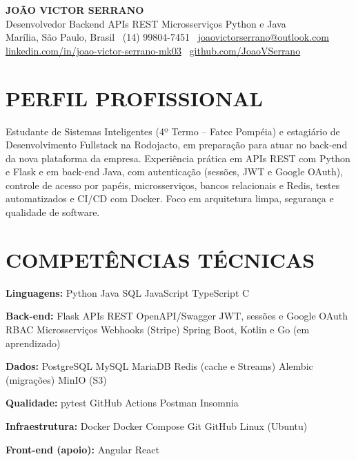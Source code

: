 \documentclass[9pt,a4paper]{extarticle}
\newcommand{\skill}[2]{\noindent\textbf{#1} #2\par}
\begin{document}
\begin{center}
  {\bfseries\color{navy}\fontsize{19}{22}\selectfont JOÃO VICTOR SERRANO}\\[2pt]
  {\color{gray}\fontsize{10}{12}\selectfont Desenvolvedor Backend \textperiodcentered{} APIs REST \textperiodcentered{} Microsserviços \textperiodcentered{} Python e Java}\\[3pt]
  {\color{gray}\fontsize{8.6}{10.5}\selectfont Marília, São Paulo, Brasil \textbar\ (14) 99804-7451 \textbar\ \href{mailto:joaovictorserrano@outlook.com}{joaovictorserrano@outlook.com}\\
  \href{https://www.linkedin.com/in/joao-victor-serrano-mk03}{linkedin.com/in/joao-victor-serrano-mk03} \textbar\ \href{https://github.com/JoaoVSerrano}{github.com/JoaoVSerrano}}
\end{center}
\section*{PERFIL PROFISSIONAL}
Estudante de Sistemas Inteligentes (4º Termo – Fatec Pompéia) e estagiário de Desenvolvimento Fullstack na Rodojacto, em preparação para atuar no back-end da nova plataforma da empresa. Experiência prática em APIs REST com Python e Flask e em back-end Java, com autenticação (sessões, JWT e Google OAuth), controle de acesso por papéis, microsserviços, bancos relacionais e Redis, testes automatizados e CI/CD com Docker. Foco em arquitetura limpa, segurança e qualidade de software.

\section*{COMPETÊNCIAS TÉCNICAS}
\skill{Linguagens:}{Python \textperiodcentered{} Java \textperiodcentered{} SQL \textperiodcentered{} JavaScript \textperiodcentered{} TypeScript \textperiodcentered{} C}
\skill{Back-end:}{Flask \textperiodcentered{} APIs REST \textperiodcentered{} OpenAPI/Swagger \textperiodcentered{} JWT, sessões e Google OAuth \textperiodcentered{} RBAC \textperiodcentered{} Microsserviços \textperiodcentered{} Webhooks (Stripe) \textperiodcentered{} Spring Boot, Kotlin e Go (em aprendizado)}
\skill{Dados:}{PostgreSQL \textperiodcentered{} MySQL \textperiodcentered{} MariaDB \textperiodcentered{} Redis (cache e Streams) \textperiodcentered{} Alembic (migrações) \textperiodcentered{} MinIO (S3)}
\skill{Qualidade:}{pytest \textperiodcentered{} GitHub Actions \textperiodcentered{} Postman \textperiodcentered{} Insomnia}
\skill{Infraestrutura:}{Docker \textperiodcentered{} Docker Compose \textperiodcentered{} Git \textperiodcentered{} GitHub \textperiodcentered{} Linux (Ubuntu)}
\skill{Front-end (apoio):}{Angular \textperiodcentered{} React}
\end{document}
